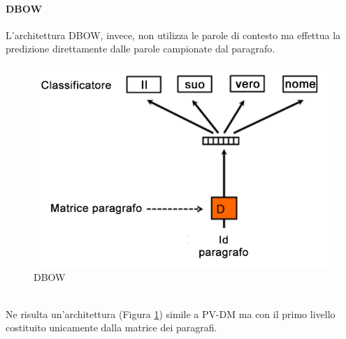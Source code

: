 \documentclass[12pt]{report}
\theoremstyle{definition}
\begin{document}
\paragraph{DBOW}
L'architettura DBOW, invece, non utilizza le parole di contesto ma effettua la predizione direttamente dalle parole campionate dal paragrafo.
\\
\begin{figure}[!h]
    \centering
    \includegraphics[scale = 0.45]{images/dbow.png}
    \caption{DBOW}
    \label{dbow}
\end{figure}
\\
Ne risulta un'architettura (Figura \ref{dbow}) simile a PV-DM ma con il primo livello costituito unicamente dalla matrice dei paragrafi.
\end{document}
